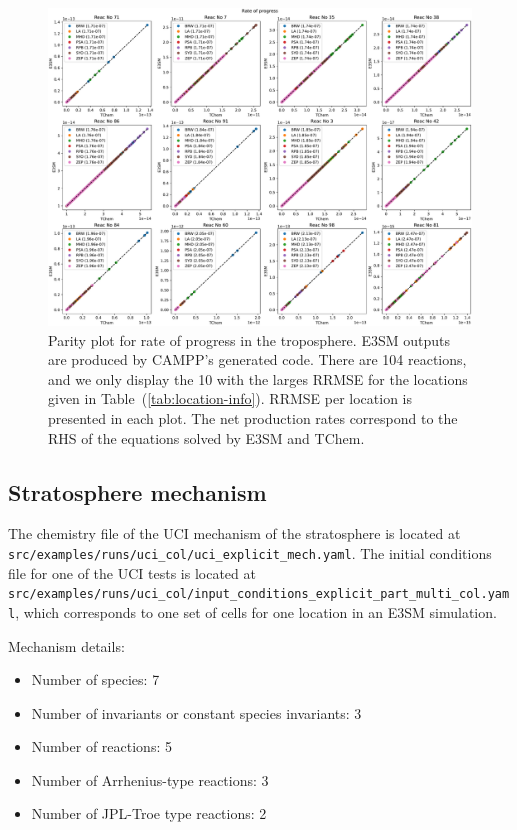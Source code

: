 \documentclass[report, 12pt]{SANDreport}
\begin{document}
\begin{figure}[htp]
  \centering
  \includegraphics[width=1\textwidth]{figures/rate_of_progress_worst.pdf}
  \caption{Parity plot for rate of progress in the troposphere. E3SM outputs are produced by CAMPP’s generated code. There are 104 reactions, and we only display the 10 with the larges RRMSE for the locations given in Table~(\ref{tab:location-info}). RRMSE per location is presented in each plot. The net production rates correspond to the RHS of the equations solved by E3SM and TChem.
  }
 \label{fig:rate_progress_parity}
\end{figure}

\subsection{Stratosphere mechanism}

The chemistry file of the UCI mechanism of the stratosphere is located at
\Verb|src/examples/runs/uci_col/uci_explicit_mech.yaml|.
The initial conditions file for one of the UCI tests is located at \Verb|src/examples/runs/uci_col/input_conditions_explicit_part_multi_col.yaml|, which corresponds to one set of cells for one location in an E3SM simulation.

Mechanism details:

\begin{itemize}
    \item Number of species: 7
    \item Number of invariants or constant species invariants: 3
    \item Number of reactions: 5
    \item Number of Arrhenius-type reactions: 3
    \item Number of JPL-Troe type reactions: 2
\end{itemize}
\end{document}
